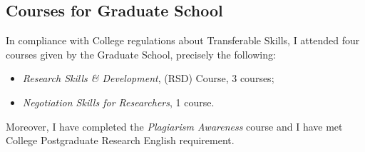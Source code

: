 \documentclass[a4paper,11pt,onecolumn]{article}
\begin{document}
\subsection{Courses for Graduate School}

In compliance with College regulations about Transferable Skills, I attended
four courses given by the Graduate School, precisely the following:

\begin{itemize}
\item \textit{Research Skills \& Development}, (RSD) Course, 3 courses;
\item \textit{Negotiation Skills for Researchers}, 1 course.
\end{itemize}

Moreover, I have completed the \textit{Plagiarism Awareness} course and I have
met College Postgraduate Research English requirement.



\end{document}
